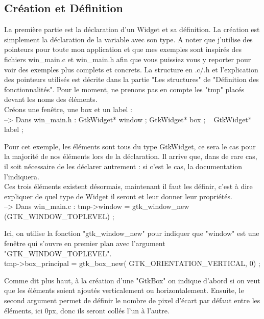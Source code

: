 \documentclass[11pt,french,a4paper]{report}
\begin{document}
        \subsection{Création et Définition}

La première partie est la déclaration d'un Widget et sa définition. La création est simplement la déclaration de la variable 
avec son type. A noter que j'utilise des pointeurs pour toute mon application et que mes exemples 
sont inspirés des fichiers win\_main.c et win\_main.h afin que vous puissiez vous y reporter pour voir des exemples plus complets et
concrets. 
La structure en .c/.h et l'explication des pointeurs utilisés est décrite dans la partie "Les structures" de 
"Définition des fonctionnalités". Pour le moment, ne prenons pas en compte les "tmp" placés devant les noms des éléments. \\

Créons une fenêtre, une box et un label : \\
--> Dans win\_main.h : 
GtkWidget* window ; 
GtkWidget* box ;   
GtkWidget* label ;  

Pour cet exemple, les éléments sont tous du type GtkWidget, ce sera le cas pour la majorité de nos éléments lors de la 
déclaration.
Il arrive que, dans de rare cas, il soit nécessaire de les déclarer autrement : si c'est le cas, la documentation l'indiquera. \\ 


Ces trois éléments existent désormais, maintenant il faut les définir, c'est à dire expliquer de quel type de Widget il seront 
et leur donner leur propriétés. \\

--> Dans win\_main.c : 
tmp->window = gtk\_window\_new (GTK\_WINDOW\_TOPLEVEL) ;

Ici, on utilise la fonction "gtk\_window\_new" pour indiquer que "window" est une fenêtre qui s'ouvre en premier plan 
avec l'argument "GTK\_WINDOW\_TOPLEVEL". \\

tmp->box\_principal = gtk\_box\_new( GTK\_ORIENTATION\_VERTICAL, 0) ;

Comme dit plus haut, à la création d'une "GtkBox" on indique d'abord si on veut que les éléments soient ajoutés verticalement 
ou horizontalement. Ensuite, le second argument permet de définir le nombre de pixel d'écart par défaut entre les éléments, 
ici 0px, donc ils seront collés l'un à l'autre.  \\
\end{document}

